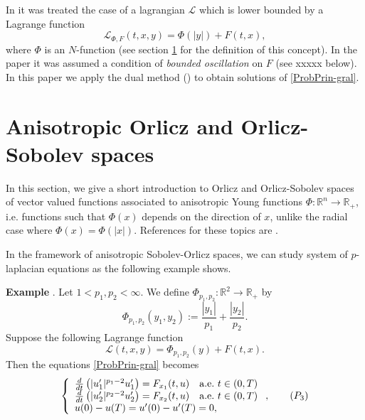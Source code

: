 \documentclass[twoside]{article}
\theoremstyle{remark}
\newcommand{\rr}{\mathbb{R}}
\newcounter{example}
\newenvironment{example}{\noindent\textbf{Example \arabic{example}}.}{\addtocounter{example}{1}}
\begin{document}
In \cite{ABGMS2015} it was treated  the case of a lagrangian $\mathcal{L}$ which is lower bounded by a Lagrange function
\begin{equation}\label{eq:lagrange_phi}
\mathcal{L}_{\Phi,F}(t,x,y)=\Phi(|y|)+F(t,x),
\end{equation}
where  $\Phi$ is an $N$-function (see section \ref{preliminares} for the definition of this concept).  
In the paper \cite{ABGMS2015} it was assumed  a condition of \emph{bounded oscillation} on $F$  (see xxxxx below). 
In this paper  we apply the dual method (\cite[Ch. 3]{mawhin2010critical}) to obtain solutions of \eqref{ProbPrin-gral}.



\section{Anisotropic Orlicz and Orlicz-Sobolev spaces}\label{preliminares}

In this section, we give a short introduction to  Orlicz and Orlicz-Sobolev spaces of vector valued functions associated to anisotropic Young functions $\Phi:\rr^n\to\rr_+$, i.e. functions such that $\Phi(x)$ depends on the direction of $x$, unlike the radial case where $\Phi(x)=\Phi(|x|)$.  References for  these topics are \cite{Orliczvectorial2005,Skaff1969, Desch2001}.

In the framework of anisotropic Sobolev-Orlicz spaces, we can study system of $p$-laplacian equations as the following example shows.


\begin{example} Let $1<p_1,p_2<\infty$. We define $\Phi_{p_1,p_2}:\rr^2\to\rr_+$  by
\[\Phi_{p_1,p_2}(y_1,y_2):=\frac{|y_1|}{p_1}+\frac{|y_2|}{p_2}.\]
Suppose the following Lagrange function
\[\mathcal{L}(t,x,y)=\Phi_{p_1,p_2}(y)+F(t,x).\]
Then the equations \eqref{ProbPrin-gral} becomes
\begin{equation}\label{eq:sist-p_lapa}
    \left\{%
\begin{array}{ll}
  \frac{d}{dt}\left(|u_1'|^{p_1-2}u_1'\right)=F_{x_1}(t,u) \quad \hbox{a.e.}\ t \in (0,T)\\
  \frac{d}{dt}\left(|u_2'|^{p_2-2}u_2'\right)=F_{x_2}(t,u) \quad \hbox{a.e.}\ t \in (0,T)\\
   u(0)-u(T)=u'(0)-u'(T)=0,
\end{array}%
\right., \tag{$P_3$}
\end{equation}


\end{example}
\end{document}
